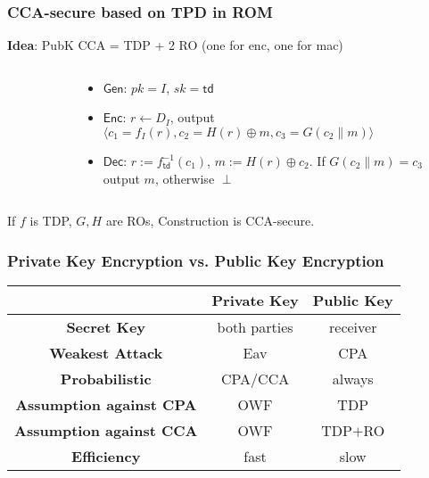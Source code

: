 \begin{frame}\frametitle{CCA-secure based on TPD in ROM}
\textbf{Idea}: PubK CCA = TDP + 2 RO (one for enc, one for mac)
\begin{columns}[t]
\begin{column}{5cm}
\begin{figure}[t]
\begin{center}

\end{center}
\end{figure}\end{column}
\begin{column}{5cm}
\begin{construction}
\begin{itemize}
\item $\mathsf{Gen}$: $pk = I$, $sk = \mathsf{td}$
\item $\mathsf{Enc}$: $r \gets D_I$, output $\langle c_1=f_I(r), c_2 = H(r)\oplus m, c_3=G(c_2\|m)\rangle$
\item $\mathsf{Dec}$: $r := f^{-1}_{\mathsf{td}}(c_1)$, $m := H(r)\oplus c_2$. If $G(c_2\|m) = c_3$ output $m$, otherwise $\perp$
\end{itemize}
\end{construction}
\end{column}
\end{columns}
\begin{theorem}
If $f$ is TDP, $G,H$ are ROs, Construction is CCA-secure.
\end{theorem}
\end{frame}

\begin{frame}\frametitle{Private Key Encryption vs. Public Key Encryption}
\begin{center}
\begin{tabular}{|c|c|c|} \hline
   & \textbf{Private Key} & \textbf{Public Key}             \\ \hline
\textbf{Secret Key}               & both parties & receiver \\ \hline
\textbf{Weakest Attack}           & Eav          & CPA      \\ \hline
\textbf{Probabilistic}            & CPA/CCA      & always   \\ \hline
\textbf{Assumption against CPA}   & OWF          & TDP      \\ \hline
\textbf{Assumption against CCA}   & OWF          & TDP$+$RO   \\ \hline
\textbf{Efficiency}               & fast         & slow     \\ \hline
\end{tabular}	
\end{center}
\end{frame}
